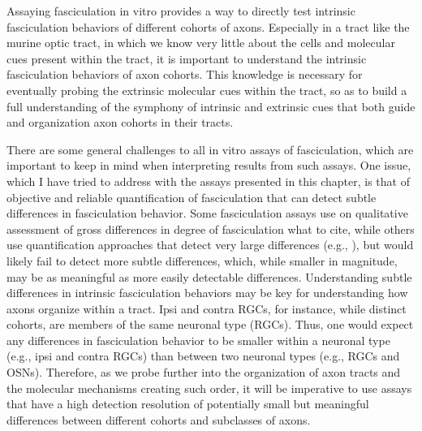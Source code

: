 Assaying fasciculation in vitro provides a way to directly test intrinsic fasciculation behaviors of different cohorts of axons.
Especially in a tract like the murine optic tract, in which we know very little about the cells and molecular cues present within the tract, it is important to understand the intrinsic fasciculation behaviors of axon cohorts.
This knowledge is necessary for eventually probing the extrinsic molecular cues within the tract, so as to build a full understanding of the symphony of intrinsic and extrinsic cues that both guide and organization axon cohorts in their tracts.

There are some general challenges to all in vitro assays of fasciculation, which are important to keep in mind when interpreting results from such assays.
One issue, which I have tried to address with the assays presented in this chapter, is that of objective and reliable quantification of fasciculation that can detect subtle differences in fasciculation behavior.
Some fasciculation assays use on qualitative assessment of gross differences in degree of fasciculation {what to cite}, while others use quantification approaches that detect very large differences (e.g., ), but would likely fail to detect more subtle differences, which, while smaller in magnitude, may be as meaningful as more easily detectable differences.
Understanding subtle differences in intrinsic fasciculation behaviors may be key for understanding how axons organize within a tract.
Ipsi and contra RGCs, for instance, while distinct cohorts, are members of the same neuronal type (RGCs). 
Thus, one would expect any differences in fasciculation behavior to be smaller within a neuronal type (e.g., ipsi and contra RGCs) than between two neuronal types (e.g., RGCs and OSNs).
Therefore, as we probe further into the organization of axon tracts and the molecular mechanisms creating such order, it will be imperative to use assays that have a high detection resolution of potentially small but meaningful differences between different cohorts and subclasses of axons.

